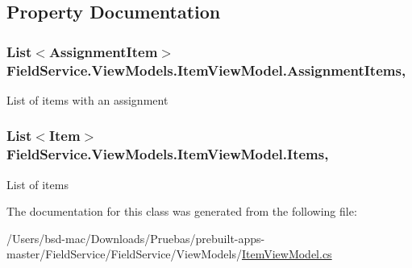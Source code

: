\subsection{Property Documentation}
\hypertarget{class_field_service_1_1_view_models_1_1_item_view_model_ac2cd5874b618e54115fc7977430d3804}{
\subsubsection[{Assignment\+Items}]{\setlength{\rightskip}{0pt plus 5cm}List$<${\bf Assignment\+Item}$>$ Field\+Service.\+View\+Models.\+Item\+View\+Model.\+Assignment\+Items\hspace{0.3cm}{\ttfamily [get]}, {\ttfamily [set]}}}\label{class_field_service_1_1_view_models_1_1_item_view_model_ac2cd5874b618e54115fc7977430d3804}


List of items with an assignment 

\hypertarget{class_field_service_1_1_view_models_1_1_item_view_model_a67045efde92e6b43b119ecf61951adda}{
\subsubsection[{Items}]{\setlength{\rightskip}{0pt plus 5cm}List$<${\bf Item}$>$ Field\+Service.\+View\+Models.\+Item\+View\+Model.\+Items\hspace{0.3cm}{\ttfamily [get]}, {\ttfamily [set]}}}\label{class_field_service_1_1_view_models_1_1_item_view_model_a67045efde92e6b43b119ecf61951adda}


List of items 



The documentation for this class was generated from the following file\+:\begin{DoxyCompactItemize}
\item 
/\+Users/bsd-\/mac/\+Downloads/\+Pruebas/prebuilt-\/apps-\/master/\+Field\+Service/\+Field\+Service/\+View\+Models/\hyperlink{_view_models_2_item_view_model_8cs}{Item\+View\+Model.\+cs}\end{DoxyCompactItemize}
